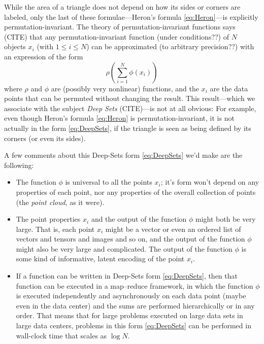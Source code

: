 \documentclass[12pt]{article}
\begin{document}
While the area of a triangle does not depend on how its sides or corners are labeled,
only the last of these formulae---Heron's formula \eqref{eq:Heron}---is explicitly permutation-invariant.
The theory of permutation-invariant functions says (CITE) that any per\-mu\-tation-invariant function (under conditions??) of $N$ objects $x_i$ (with $1\leq i\leq N$) can be approximated (to arbitrary precision??) with an expression of the form
\begin{equation}
    \rho(\sum_{i=1}^N\phi(x_i)) \label{eq:DeepSets}
\end{equation}
where $\rho$ and $\phi$ are (possibly very nonlinear) functions,
and the $x_i$ are the data points that can be permuted without changing the result.
This result---which we associate with the subject \emph{Deep Sets} (CITE)---is not at all obvious:
For example, even though Heron's formula \eqref{eq:Heron} is permutation-invariant, it is not actually in the form \eqref{eq:DeepSets}, if the triangle is seen as being defined by its corners (or even its sides).

A few comments about this Deep-Sets form \eqref{eq:DeepSets} we'd make are the following:
\begin{itemize}
    \item The function $\phi$ is universal to all the points $x_i$; it's form won't depend on any properties of each point, nor any properties of the overall collection of points (the \emph{point cloud}, as it were).
    \item The point properties $x_i$ and the output of the function $\phi$ might both be very large.
    That is, each point $x_i$ might be a vector or even an ordered list of vectors and tensors and images and so on, and the output of the function $\phi$ might also be very large and complicated.
    The output of the function $\phi$ is some kind of informative, latent encoding of the point $x_i$.
    \item If a function can be written in Deep-Sets form \eqref{eq:DeepSets}, then that function can be executed in a map--reduce framework, in which the function $\phi$ is executed independently and asynchronously on each data point (maybe even in the data center) and the sums are performed hierarchically or in any order.
    That means that for large problems executed on large data sets in large data centers, problems in this form \eqref{eq:DeepSets} can be performed in wall-clock time that scales as $\log N$.
\end{itemize}
\end{document}
